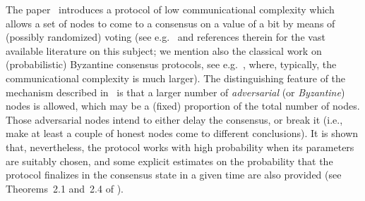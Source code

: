 \documentclass[../main.tex]{subfiles}
\begin{document}
The paper~\cite{popov2019} introduces a protocol 
of low communicational complexity
which allows a set of nodes to come to a 
consensus on a value of a bit by means 
of (possibly randomized) voting
(see e.g.\ \cite{Becchetti2016,cooper2014,cooper2015, elsasser2016,fanti2019,mallmann2017}
and references therein for the vast available literature 
on this subject; we mention also the classical work on (probabilistic)
Byzantine consensus protocols,
see e.g.~\cite{AguTou12, Ben83, Bra87, CasLis02, 
FelMic89, FriMosRay04, Rab83}, where,
typically, the communicational complexity is much larger).
The distinguishing feature of the mechanism described in~\cite{popov2019}
is that a larger number of
\emph{adversarial} (or \emph{Byzantine})
 nodes is allowed, which may be a (fixed)
proportion of the total number of nodes.
Those adversarial nodes 
intend to either delay the consensus,
or break it (i.e., make at least a couple of honest nodes
come to different conclusions).
 It is shown that,
nevertheless, the protocol works with high probability
 when its parameters
 are suitably chosen, and  
some explicit estimates on the probability 
that the protocol finalizes in the consensus state
in a given time are also provided (see Theorems~2.1
and~2.4 of \cite{popov2019}).
\end{document}

